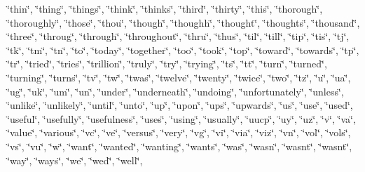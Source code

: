 \char`\"{}thin\char`\"{}, \char`\"{}thing\char`\"{}, \char`\"{}things\char`\"{}, \char`\"{}think\char`\"{}, \char`\"{}thinks\char`\"{}, \char`\"{}third\char`\"{}, \char`\"{}thirty\char`\"{}, \char`\"{}this\char`\"{}, \char`\"{}thorough\char`\"{}, \char`\"{}thoroughly\char`\"{}, \char`\"{}those\char`\"{}, \char`\"{}thou\char`\"{}, \char`\"{}though\char`\"{}, \char`\"{}thoughh\char`\"{}, \char`\"{}thought\char`\"{}, \char`\"{}thoughts\char`\"{}, \char`\"{}thousand\char`\"{}, \char`\"{}three\char`\"{}, \char`\"{}throug\char`\"{}, \char`\"{}through\char`\"{}, \char`\"{}throughout\char`\"{}, \char`\"{}thru\char`\"{}, \char`\"{}thus\char`\"{}, \char`\"{}til\char`\"{}, \char`\"{}till\char`\"{}, \char`\"{}tip\char`\"{}, \char`\"{}tis\char`\"{}, \char`\"{}tj\char`\"{}, \char`\"{}tk\char`\"{}, \char`\"{}tm\char`\"{}, \char`\"{}tn\char`\"{}, \char`\"{}to\char`\"{}, \char`\"{}today\char`\"{}, \char`\"{}together\char`\"{}, \char`\"{}too\char`\"{}, \char`\"{}took\char`\"{}, \char`\"{}top\char`\"{}, \char`\"{}toward\char`\"{}, \char`\"{}towards\char`\"{}, \char`\"{}tp\char`\"{}, \char`\"{}tr\char`\"{}, \char`\"{}tried\char`\"{}, \char`\"{}tries\char`\"{}, \char`\"{}trillion\char`\"{}, \char`\"{}truly\char`\"{}, \char`\"{}try\char`\"{}, \char`\"{}trying\char`\"{}, \char`\"{}ts\char`\"{}, \char`\"{}tt\char`\"{}, \char`\"{}turn\char`\"{}, \char`\"{}turned\char`\"{}, \char`\"{}turning\char`\"{}, \char`\"{}turns\char`\"{}, \char`\"{}tv\char`\"{}, \char`\"{}tw\char`\"{}, \char`\"{}twas\char`\"{}, \char`\"{}twelve\char`\"{}, \char`\"{}twenty\char`\"{}, \char`\"{}twice\char`\"{}, \char`\"{}two\char`\"{}, \char`\"{}tz\char`\"{}, \char`\"{}u\char`\"{}, \char`\"{}ua\char`\"{}, \char`\"{}ug\char`\"{}, \char`\"{}uk\char`\"{}, \char`\"{}um\char`\"{}, \char`\"{}un\char`\"{}, \char`\"{}under\char`\"{}, \char`\"{}underneath\char`\"{}, \char`\"{}undoing\char`\"{}, \char`\"{}unfortunately\char`\"{}, \char`\"{}unless\char`\"{}, \char`\"{}unlike\char`\"{}, \char`\"{}unlikely\char`\"{}, \char`\"{}until\char`\"{}, \char`\"{}unto\char`\"{}, \char`\"{}up\char`\"{}, \char`\"{}upon\char`\"{}, \char`\"{}ups\char`\"{}, \char`\"{}upwards\char`\"{}, \char`\"{}us\char`\"{}, \char`\"{}use\char`\"{}, \char`\"{}used\char`\"{}, \char`\"{}useful\char`\"{}, \char`\"{}usefully\char`\"{}, \char`\"{}usefulness\char`\"{}, \char`\"{}uses\char`\"{}, \char`\"{}using\char`\"{}, \char`\"{}usually\char`\"{}, \char`\"{}uucp\char`\"{}, \char`\"{}uy\char`\"{}, \char`\"{}uz\char`\"{}, \char`\"{}v\char`\"{}, \char`\"{}va\char`\"{}, \char`\"{}value\char`\"{}, \char`\"{}various\char`\"{}, \char`\"{}vc\char`\"{}, \char`\"{}ve\char`\"{}, \char`\"{}versus\char`\"{}, \char`\"{}very\char`\"{}, \char`\"{}vg\char`\"{}, \char`\"{}vi\char`\"{}, \char`\"{}via\char`\"{}, \char`\"{}viz\char`\"{}, \char`\"{}vn\char`\"{}, \char`\"{}vol\char`\"{}, \char`\"{}vols\char`\"{}, \char`\"{}vs\char`\"{}, \char`\"{}vu\char`\"{}, \char`\"{}w\char`\"{}, \char`\"{}want\char`\"{}, \char`\"{}wanted\char`\"{}, \char`\"{}wanting\char`\"{}, \char`\"{}wants\char`\"{}, \char`\"{}was\char`\"{}, \char`\"{}wasn\char`\"{}, \char`\"{}wasn\textquotesingle{}t\char`\"{}, \char`\"{}wasnt\char`\"{}, \char`\"{}way\char`\"{}, \char`\"{}ways\char`\"{}, \char`\"{}we\char`\"{}, \char`\"{}we\textquotesingle{}d\char`\"{}, \char`\"{}we\textquotesingle{}ll\char`\"{}, 